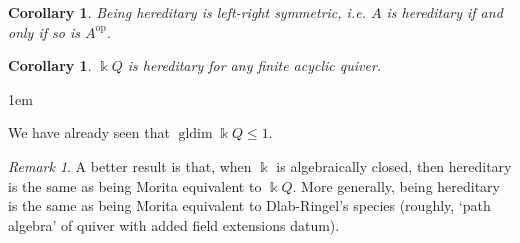 \documentclass[11pt,a4paper]{article}
\makeatletter
\numberwithin{equation}{section}
\renewenvironment{proof}[1][\proofname]{\par
    \pushQED{\qed}%
    \normalfont \topsep0\p@\@plus6\p@ \labelsep1em\relax
    \trivlist
    \item[\hskip\labelsep\indent
        \bfseries #1]\ignorespaces
    \mbox{}
}{
    \popQED\endtrivlist\@endpefalse
}
\theoremstyle{all}
\newtheorem{corollary}[theorem]{Corollary}
\theoremstyle{remark}
\newtheorem{remark}[theorem]{Remark}
\newcommand{\op}{\mathrm{op}}
\newcommand{\gldim}{\operatorname{gldim}\nolimits}
\makeatother
\begin{document}
\begin{corollary}
Being hereditary is left-right symmetric, i.e. $A$ is hereditary if and only if so is $A^\op$.
\end{corollary}

\begin{corollary}
$\Bbbk Q$ is hereditary for any finite acyclic quiver.
\end{corollary}
\begin{proof}
We have already seen that $\gldim \Bbbk Q\leq 1$.
\end{proof}
\begin{remark}
A better result is that, when $\Bbbk$ is algebraically closed, then hereditary is the same as being Morita equivalent to $\Bbbk Q$.
More generally, being hereditary is the same as being Morita equivalent to Dlab-Ringel's species (roughly, `path algebra' of quiver with added field extensions datum).
\end{remark}





\pagebreak

\end{document}
